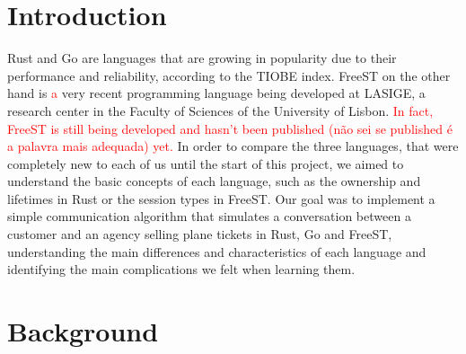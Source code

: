 \documentclass[runningheads]{llncs}
\begin{document}
\section{Introduction}
Rust and Go are languages that are growing in popularity due to their performance and reliability, according to the TIOBE index. FreeST\cite{freest} on the other hand is \textcolor{red}{a} very recent programming language being developed at LASIGE, a research center in the Faculty of Sciences of the University of Lisbon. \textcolor{red}{In fact, FreeST is still being developed and hasn't been published (não sei se published é a palavra mais adequada) yet.}
In order to compare the three languages, that were completely new to each of us until the start of this project, we aimed to understand the basic concepts of each language, such as the ownership and lifetimes in Rust or the session types \cite{session} in FreeST.
Our goal was to implement a simple communication algorithm that simulates a conversation between a customer and an agency selling plane tickets in Rust, Go and FreeST, understanding the main differences and characteristics of each language and identifying the main complications we felt when learning them.
\newpage
\section{Background}
\end{document}
